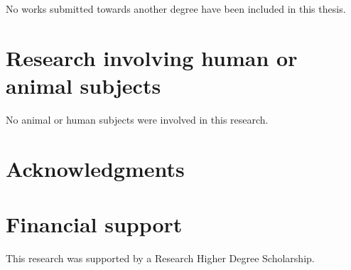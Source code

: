 No works submitted towards another degree have been included in this thesis.

\section*{Research involving human or animal subjects}

No animal or human subjects were involved in this research.

\clearpage

\section*{Acknowledgments}



\clearpage

\section*{Financial support}



This research was supported by a Research Higher Degree Scholarship.




